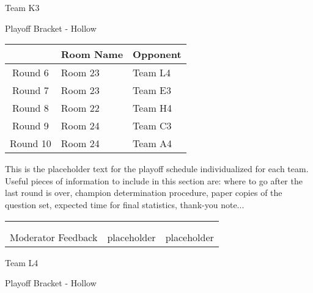 \documentclass{article}%
\begin{document}
\newpage%
\begin{center}%
\begin{Huge}%
Team K3%
\end{Huge}%
\vspace*{12pt}%
\linebreak%
\begin{Large}%
Playoff Bracket {-} Hollow%
\end{Large}%
\end{center}%
\vspace*{4pt}%
%
\begin{tabularx}{\textwidth}{|c|Y|Y|}%
\hline%
&Room Name&Opponent\\%
\hline%
Round 6&Room 23&Team L4\\%
Round 7&Room 23&Team E3\\%
Round 8&Room 22&Team H4\\%
Round 9&Room 24&Team C3\\%
Round 10&Room 24&Team A4\\%
\hline%
\end{tabularx}%
\vspace*{30pt}%
\linebreak%
This is the placeholder text for the playoff schedule individualized for each team. Useful pieces of information to include in this section are: where to go after the last round is over, champion determination procedure, paper copies of the question set, expected time for final statistics, thank{-}you note...%
\vspace*{30pt}%
\newline%
%
\begin{tabularx}{\textwidth}{YYY}%
  &  &  \\%
\\%
Moderator Feedback&placeholder&placeholder\\%
\end{tabularx}%
\newpage%
\begin{center}%
\begin{Huge}%
Team L4%
\end{Huge}%
\vspace*{12pt}%
\linebreak%
\begin{Large}%
Playoff Bracket {-} Hollow%
\end{Large}%
\end{center}%
\end{document}
